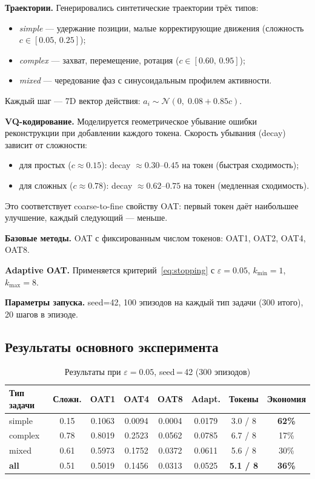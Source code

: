 \documentclass[12pt,a4paper]{article}
\begin{document}
\textbf{Траектории.} Генерировались синтетические траектории трёх типов:
\begin{itemize}[leftmargin=1.4cm]
    \item \textit{simple} --- удержание позиции, малые корректирующие движения
          (сложность $c \in [0.05,\, 0.25]$);
    \item \textit{complex} --- захват, перемещение, ротация
          ($c \in [0.60,\, 0.95]$);
    \item \textit{mixed} --- чередование фаз с синусоидальным профилем активности.
\end{itemize}
Каждый шаг --- 7D вектор действия: $a_i \sim \mathcal{N}(0,\; 0.08 + 0.85c)$.

\textbf{VQ-кодирование.} Моделируется геометрическое убывание ошибки реконструкции
при добавлении каждого токена. Скорость убывания (decay) зависит от сложности:
\begin{itemize}[leftmargin=1.4cm]
    \item для простых ($c \approx 0.15$): decay $\approx 0.30$--$0.45$ на токен
          (быстрая сходимость);
    \item для сложных ($c \approx 0.78$): decay $\approx 0.62$--$0.75$ на токен
          (медленная сходимость).
\end{itemize}
Это соответствует coarse-to-fine свойству OAT: первый токен даёт наибольшее
улучшение, каждый следующий --- меньше.

\textbf{Базовые методы.} OAT с фиксированным числом токенов: OAT1, OAT2, OAT4, OAT8.

\textbf{Adaptive OAT.} Применяется критерий~\eqref{eq:stopping} с $\varepsilon = 0.05$,
$k_{\min}=1$, $k_{\max}=8$.

\textbf{Параметры запуска.} seed=42, 100 эпизодов на каждый тип задачи
(300 итого), 20 шагов в эпизоде.

\subsection{Результаты основного эксперимента}

\begin{table}[h!]
\centering
\caption{Результаты при $\varepsilon = 0.05$, seed\,=\,42 (300 эпизодов)}
\label{tab:main}
\begin{tabular}{lccccccc}
\toprule
\textbf{Тип задачи} & \textbf{Сложн.} & \textbf{OAT1} & \textbf{OAT4} & \textbf{OAT8}
    & \textbf{Adapt.} & \textbf{Токены} & \textbf{Экономия} \\
\midrule
simple  & 0.15 & 0.1063 & 0.0094 & 0.0004 & 0.0179 & 3.0 / 8 & \textbf{62\%} \\
complex & 0.78 & 0.8019 & 0.2523 & 0.0562 & 0.0785 & 6.7 / 8 & 17\% \\
mixed   & 0.61 & 0.5973 & 0.1752 & 0.0372 & 0.0611 & 5.6 / 8 & 30\% \\
\midrule
\textbf{all}     & 0.51 & 0.5019 & 0.1456 & 0.0313 & 0.0525 & \textbf{5.1 / 8} & \textbf{36\%} \\
\bottomrule
\end{tabular}
\end{table}
\end{document}
